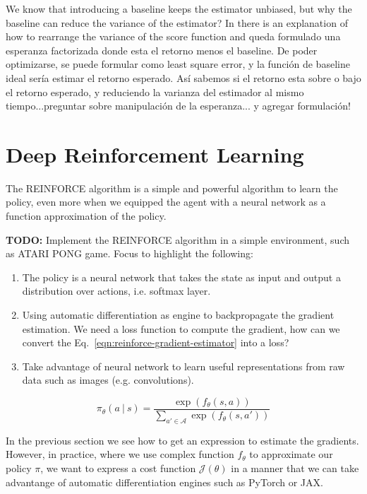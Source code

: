 We know that introducing a baseline keeps the estimator unbiased, but why
the baseline can reduce the variance of the estimator? In \cite{seita2017going}
there is an explanation of how to rearrange the variance of the score function and queda formulado una esperanza factorizada donde esta el retorno menos el baseline. De poder optimizarse, se puede formular como least square error, y
la función de baseline ideal sería estimar el retorno esperado. Así sabemos
si el retorno esta sobre o bajo el retorno esperado, y reduciendo la varianza 
del estimador al mismo tiempo...preguntar sobre manipulación de la esperanza...
y agregar formulación!


\section{Deep Reinforcement Learning}

The REINFORCE algorithm is a simple and powerful algorithm to learn the policy,
even more when we equipped the agent with a neural network as a function 
approximation of the policy. 

\textbf{TODO:} Implement the REINFORCE algorithm in a simple environment, such as ATARI PONG game. Focus to highlight the following:

\begin{enumerate}
    \item The policy is a neural network that takes the state as input and output a distribution over actions, i.e. softmax layer.  
    \item Using automatic differentiation as engine to backpropagate the gradient estimation. We need a loss function to compute the gradient, how
    can we convert the Eq.~\ref{eqn:reinforce-gradient-estimator} into a loss?
    \item Take advantage of neural network to learn useful representations from raw data such as images (e.g. convolutions).
\end{enumerate}

\begin{equation}\label{eqn:neural-softmax-policies}
    \pi_{\theta}(a~|~s) = \frac{\exp(f_{\theta}(s, a))}{\sum_{a'\in\mathcal{A}}\exp(f_{\theta}(s, a'))}
\end{equation}

In the previous section we see how to get an expression to estimate the gradients. However, in practice, where we use complex function
$f_{\theta}$ to approximate our policy $\pi$, we want to express a cost
function $\mathcal{J}(\theta)$ in a manner that we can take advantange of 
automatic differentiation engines such as PyTorch or JAX.

